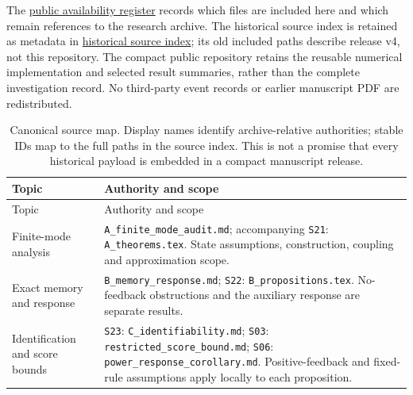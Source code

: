 The \href{https://github.com/Drefetr/InhibitoryEarthquakeModels/blob/3e76a174cf4f58ce601c6c9640c4d0c11168813f/paper/supplements/source_availability.json}{public availability register} records which files are included here and which remain references to the research archive. The historical source index is retained as metadata in \href{https://github.com/Drefetr/InhibitoryEarthquakeModels/blob/3e76a174cf4f58ce601c6c9640c4d0c11168813f/provenance/historical_v4_source_index.json}{historical source index}; its old included paths describe release v4, not this repository. The compact public repository retains the reusable numerical implementation and selected result summaries, rather than the complete investigation record. No third-party event records or earlier manuscript PDF are redistributed.

\begin{longtable}{@{}>{\raggedright\arraybackslash}p{}>{\raggedright\arraybackslash}p{}@{}}
\caption{Canonical source map. Display names identify archive-relative authorities; stable IDs map to the full paths in the source index. This is not a promise that every historical payload is embedded in a compact manuscript release.}\label{tab:authority_map}\\
\toprule
Topic & Authority and scope \\
\midrule
\endfirsthead
\toprule Topic & Authority and scope \\\midrule
\endhead
Finite-mode analysis & \nolinkurl{A_finite_mode_audit.md}; accompanying \texttt{S21}: \nolinkurl{A_theorems.tex}. State assumptions, construction, coupling and approximation scope. \\
Exact memory and response & \nolinkurl{B_memory_response.md}; \texttt{S22}: \nolinkurl{B_propositions.tex}. No-feedback obstructions and the auxiliary response are separate results. \\
Identification and score bounds & \texttt{S23}: \nolinkurl{C_identifiability.md}; \texttt{S03}: \nolinkurl{restricted_score_bound.md}; \texttt{S06}: \nolinkurl{power_response_corollary.md}. Positive-feedback and fixed-rule assumptions apply locally to each proposition. \\

\end{longtable}
